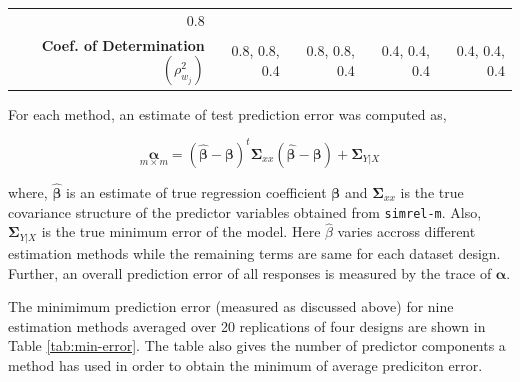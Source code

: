 \documentclass[num-refs]{wiley-article}
\begin{document}
\begin{longtable}[]{@{}rrrrr@{}}
\begin{minipage}[t]{0.13\columnwidth}
0.8\strut
\end{minipage}\tabularnewline
\begin{minipage}[t]{0.35\columnwidth}\raggedleft\strut
\textbf{Coef. of Determination \((\rho^2_{w_j})\)}\strut
\end{minipage} & \begin{minipage}[t]{0.13\columnwidth}\raggedleft\strut
0.8, 0.8, 0.4\strut
\end{minipage} & \begin{minipage}[t]{0.13\columnwidth}\raggedleft\strut
0.8, 0.8, 0.4\strut
\end{minipage} & \begin{minipage}[t]{0.13\columnwidth}\raggedleft\strut
0.4, 0.4, 0.4\strut
\end{minipage} & \begin{minipage}[t]{0.13\columnwidth}\raggedleft\strut
0.4, 0.4, 0.4\strut
\end{minipage}\tabularnewline
\bottomrule
\end{longtable}

For each method, an estimate of test prediction error was computed as,

\[\underset{m \times m}{\boldsymbol{\alpha}} = 
\left(
\hat{\boldsymbol{\beta}} - \boldsymbol{\beta}
\right) ^t \boldsymbol{\Sigma}_{xx}
\left(
\hat{\boldsymbol{\beta}} - \boldsymbol{\beta}
\right) + \boldsymbol{\Sigma}_{Y|X}\]

where, \(\hat{\boldsymbol{\beta}}\) is an estimate of true regression
coefficient \(\boldsymbol{\beta}\) and \(\boldsymbol{\Sigma}_{xx}\) is
the true covariance structure of the predictor variables obtained from
\texttt{simrel-m}. Also, \(\boldsymbol{\Sigma}_{Y|X}\) is the true
minimum error of the model. Here \(\hat{\beta}\) varies accross
different estimation methods while the remaining terms are same for each
dataset design. Further, an overall prediction error of all responses is
measured by the trace of \(\boldsymbol{\alpha}\).

The minimimum prediction error (measured as discussed above) for nine
estimation methods averaged over 20 replications of four designs are
shown in Table \ref{tab:min-error}. The table also gives the number of
predictor components a method has used in order to obtain the minimum of
average prediciton error.
\end{document}
